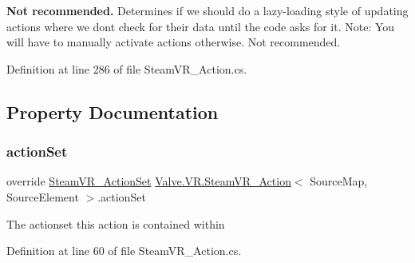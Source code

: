 {\bfseries{Not recommended.}} Determines if we should do a lazy-\/loading style of updating actions where we don\textquotesingle{}t check for their data until the code asks for it. Note\+: You will have to manually activate actions otherwise. Not recommended. 



Definition at line 286 of file Steam\+V\+R\+\_\+\+Action.\+cs.



\subsection{Property Documentation}
\mbox{\label{class_valve_1_1_v_r_1_1_steam_v_r___action_ad4b01239b68cfa6a4b0daa1c91e2f134}} 
\subsubsection{\texorpdfstring{actionSet}{actionSet}\hspace{0.1cm}{\footnotesize\ttfamily [1/2]}}
{\footnotesize\ttfamily override \mbox{\hyperlink{class_valve_1_1_v_r_1_1_steam_v_r___action_set}{Steam\+V\+R\+\_\+\+Action\+Set}} \mbox{\hyperlink{class_valve_1_1_v_r_1_1_steam_v_r___action}{Valve.\+V\+R.\+Steam\+V\+R\+\_\+\+Action}}$<$ Source\+Map, Source\+Element $>$.action\+Set\hspace{0.3cm}{\ttfamily [get]}}



The actionset this action is contained within 



Definition at line 60 of file Steam\+V\+R\+\_\+\+Action.\+cs.

\mbox{\label{class_valve_1_1_v_r_1_1_steam_v_r___action_a136c44b47df0a9380c4488059b125fd3}} 
